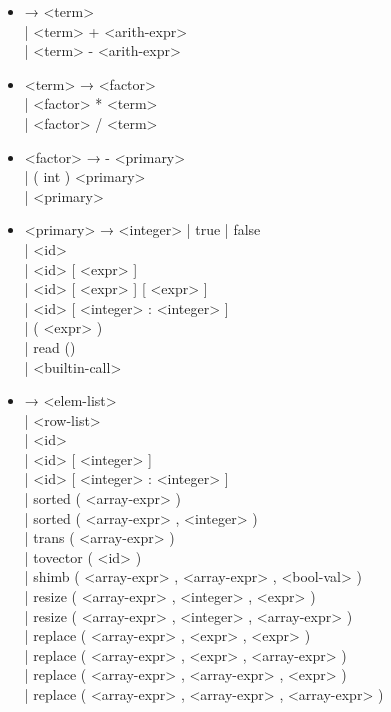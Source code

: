 \documentclass[a4paper,final]{article}
\begin{document}
\begin{itemize}
\begin{itemize}
                \\| <arith-expr> >= <arith-expr>
\item <arith-expr>   → <term> \\| <term> + <arith-expr> \\| <term> - <arith-expr>
\item <term>         → <factor> \\| <factor> * <term> \\| <factor> / <term>
\item <factor>       → - <primary> \\| ( int ) <primary> \\| <primary>
\item <primary>      → <integer> | true | false
                \\| <id>
                \\| <id> [ <expr> ]
                \\| <id> [ <expr> ] [ <expr> ]
                \\| <id> [ <integer> : <integer> ]
                \\| ( <expr> )
                \\| read ()
                \\| <builtin-call>
\item <array-expr>   → { <elem-list> } \\| { <row-list> }
                \\| <id> \\| <id> [ <integer> ] \\| <id> [ <integer> : <integer> ]
                \\| sorted ( <array-expr> ) \\| sorted ( <array-expr> , <integer> )
                \\| trans ( <array-expr> ) \\| tovector ( <id> )
                \\| shimb ( <array-expr> , <array-expr> , <bool-val> )
                \\| resize ( <array-expr> , <integer> , <expr> ) \\| resize ( <array-expr> , <integer> , <array-expr> )
                \\| replace ( <array-expr> , <expr> , <expr> ) \\| replace ( <array-expr> , <expr> , <array-expr> )
                \\| replace ( <array-expr> , <array-expr> , <expr> ) \\| replace ( <array-expr> , <array-expr> , <array-expr> )

\end{itemize}
\end{itemize}
\end{document}
